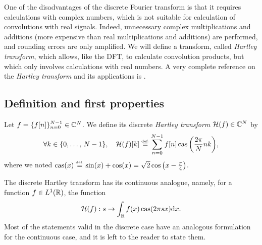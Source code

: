   One of the disadvantages of the discrete Fourier transform is that it requires calculations with complex numbers, which is not suitable for calculation of convolutions with real signals. Indeed, unnecessary complex multiplications and additions (more expensive than real multiplications and additions) are performed, and rounding errors are only amplified. We will define a transform, called \textit{Hartley transform}, which allows, like the DFT, to calculate convolution products, but which only involves calculations with real numbers. A very complete reference on the \textit{Hartley transform} and its applications is  \cite{bracewell}.
\subsection{Definition and first properties}
 
 
 
\begin{defn}
\label{notation-58} \label{notation-59} Let $ f = \{f [n] \}_{n = 0}^{N-1} \in \mathbb{C}^N $. We define its discrete \textit{Hartley transform} $ \mathcal{H} (f) \in \mathbb{C}^N $ by
\begin{equation}
\label{eq-defn-transfo-hartley}
\forall k \in \{0, \ldots, \, N-1 \}, \quad \mathcal{H} (f) [k] \stackrel{\mbox{\upshape\tiny def.}}{=} \sum_{n = 0}^{N-1}{f [n] \operatorname{cas} \left(\frac{2 \pi}{N} nk \right)},
\end{equation}
where we noted $ \operatorname{cas} (x) \stackrel{\mbox{\upshape\tiny def.}}{=} \sin (x) + \cos (x) = \sqrt{2} \cos \left(x - \frac{\pi}{4} \right) $.
\end{defn}
 
 
\begin{rem}
The discrete Hartley transform has its continuous analogue, namely, for a function $ f \in L^1 (\mathbb{R}) $, the function
\begin{equation*}
\mathcal{H} (f): s \rightarrow \int_{\mathbb{R}}{f(x) \operatorname{cas} (2 \pi sx) \mathrm{d} x}.
\end{equation*}
Most of the statements valid in the discrete case have an analogous formulation for the continuous case, and it is left to the reader to state them.
\end{rem}
 
